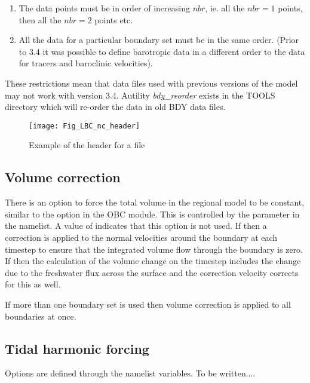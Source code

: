 \documentclass[../main/NEMO_manual]{subfiles}
\begin{document}
\begin{enumerate}
\item The data points must be in order of increasing $nbr$,
  ie. all the $nbr=1$ points, then all the $nbr=2$ points etc.
\item All the data for a particular boundary set must be in the same order.
  (Prior to 3.4 it was possible to define barotropic data in a different order to
  the data for tracers and baroclinic velocities). 
\end{enumerate}

These restrictions mean that data files used with previous versions of the model may not work with version 3.4.
A\fortran utility {\it bdy\_reorder} exists in the TOOLS directory which
will re-order the data in old BDY data files. 

\begin{figure}[!t]
  \begin{center}
    \texttt{[image: Fig\_LBC\_nc\_header]}
    \caption {
      \protect\label{fig:LBC_nc_header}
      Example of the header for a \protect{} file
    }
  \end{center}
\end{figure}

\subsection{Volume correction}
\label{subsec:BDY_vol_corr}

There is an option to force the total volume in the regional model to be constant,
similar to the option in the OBC module.
This is controlled  by the  parameter in the namelist.
A value of  indicates that this option is not used.
If  then a correction is applied to the normal velocities around the boundary at
each timestep to ensure that the integrated volume flow through the boundary is zero.
If  then the calculation of the volume change on
the timestep includes the change due to the freshwater flux across the surface and
the correction velocity corrects for this as well.

If more than one boundary set is used then volume correction is
applied to all boundaries at once.

\newpage
\subsection{Tidal harmonic forcing}
\label{subsec:BDY_tides}



Options are defined through the   namelist variables.
 To be written....

\biblio

\pindex
\end{document}
